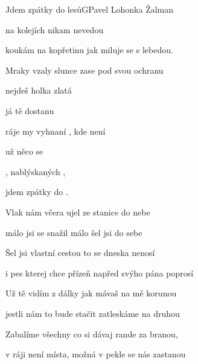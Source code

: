 \begin{song}{Jdem zpátky do lesů}{G}{Pavel Lohonka Žalman}

\begin{SBVerse}

 na kolejích  nikam nevedou

koukám na kopřetinu jak miluje se s lebedou.

Mraky vzaly slunce zase pod svou ochranu

 nejdeš holka zlatá

 já tě dostanu

\end{SBVerse}

\begin{SBChorus}

 ráje my vyhnaní , kde není

už   něco se 

, nablýskaných ,

jdem zpátky do .  

\end{SBChorus}

\begin{SBVerse}

Vlak nám včera ujel ze stanice do nebe

málo jsi se snažil málo šel jsi do sebe

Šel jsi vlastní cestou to se dneska nenosí

i pes kterej chce přízeň napřed svýho pána poprosí

\end{SBVerse}

\begin{SBChorus}

\end{SBChorus}

\begin{SBVerse}

Už tě vidím z dálky jak mávaš na mě korunou

jestli nám to bude stačit zatleskáme na druhou

Zabalíme všechny co si dávaj rande za branou,

v ráji není místa, možná v pekle se nás zastanou

\end{SBVerse}

\begin{SBChorus}

\end{SBChorus}

\end{song}

\clearpage
